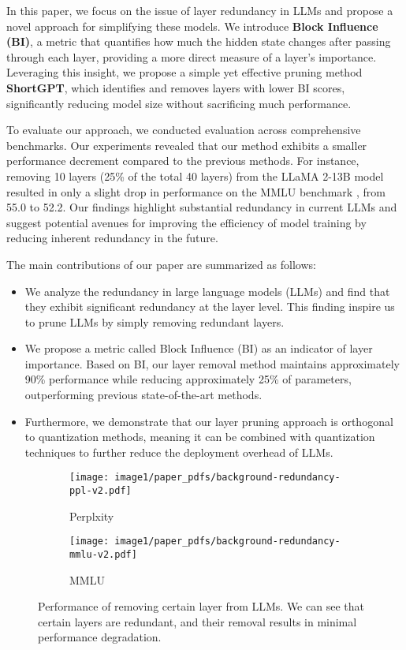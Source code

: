 	
	In this paper, we focus on the issue of layer redundancy in LLMs and propose a novel approach for simplifying these models. We introduce \textbf{Block Influence (BI)}, a metric that quantifies how much the hidden state changes after passing through each layer, providing a more direct measure of a layer's importance. Leveraging this insight, we propose a simple yet effective pruning method \textbf{ShortGPT}, which identifies and removes layers with lower BI scores, significantly reducing model size without sacrificing much performance. 
	
	To evaluate our approach, we conducted evaluation across comprehensive benchmarks.  Our experiments revealed that our method exhibits a smaller performance decrement compared to the previous methods. For instance,  removing 10 layers (25\% of the total 40 layers) from the LLaMA 2-13B model resulted in only a slight drop in performance on the MMLU benchmark \citep{hendrycks2020measuring}, from 55.0 to 52.2. Our findings highlight substantial redundancy in current LLMs and suggest potential avenues for improving the efficiency of model training by reducing inherent redundancy in the future.
	
	The main contributions of our paper are summarized as follows:
	\begin{itemize}
		\item We analyze the redundancy in large language models (LLMs) and find that they exhibit significant redundancy at the layer level. This finding inspire us to prune LLMs by simply removing redundant layers. 
		\item We propose a metric called Block Influence (BI) as an  indicator of layer importance. Based on BI,  our layer removal method maintains approximately 90\% performance while reducing approximately 25\% of  parameters, outperforming previous state-of-the-art methods.
		\item Furthermore, we demonstrate that our layer pruning approach is orthogonal to quantization methods, meaning it can be combined with quantization techniques to further reduce the deployment overhead of LLMs.
	\end{itemize}	
	
	\begin{figure}[t]
		\centering
		\begin{subfigure}[t]{0.45\textwidth}
			\centering  
			\texttt{[image: image1/paper\_pdfs/background-redundancy-ppl-v2.pdf]}
			\caption{Perplxity}
			\label{fig:overall_illustartion_llama2:1}
		\end{subfigure}
		\hfill
		\begin{subfigure}[t]{0.45\textwidth}
			\centering  
			\texttt{[image: image1/paper\_pdfs/background-redundancy-mmlu-v2.pdf]}
			\caption{MMLU}
		\end{subfigure}
		\caption{Performance of removing certain layer from LLMs. We can see that certain layers are redundant, and their removal results in minimal performance degradation. }    %
		\label{fig:background-redundancy}    %
	\end{figure}
